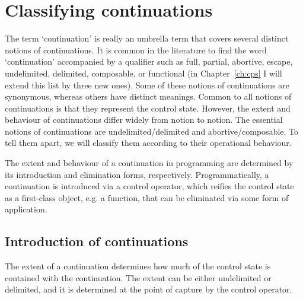 \documentclass[12pt,phd,lfcs,twoside,openright,logo,leftchapter,normalheadings]{infthesis}
\theoremstyle{plain}
\theoremstyle{definition}
\begin{document}

\section{Classifying continuations}
\label{sec:classifying-continuations}

The term `continuation' is really an umbrella term that covers several
distinct notions of continuations. It is common in the literature to
find the word `continuation' accompanied by a qualifier such as full,
partial, abortive, escape, undelimited, delimited, composable, or
functional (in Chapter~\ref{ch:cps} I will extend this list by three
new ones). Some of these notions of continuations are synonymous,
whereas others have distinct meanings. Common to all notions of
continuations is that they represent the control state. However, the
extent and behaviour of continuations differ widely from notion to
notion. The essential notions of continuations are
undelimited/delimited and abortive/composable. To tell them apart, we
will classify them according to their operational behaviour.

The extent and behaviour of a continuation in programming are
determined by its introduction and elimination forms,
respectively. Programmatically, a continuation is introduced via a
control operator, which reifies the control state as a first-class
object, e.g. a function, that can be eliminated via some form of
application.

\subsection{Introduction of continuations}
%
The extent of a continuation determines how much of the control state
is contained with the continuation.
%
The extent can be either undelimited or delimited, and it is
determined at the point of capture by the control operator.
%
\end{document}
